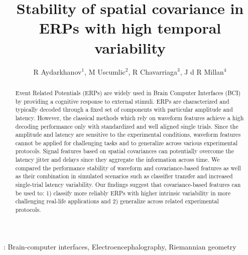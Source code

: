 \documentclass[12pt]{iopart}
\begin{document}
\title[]{Stability of spatial covariance in ERPs with high temporal variability}

\author{R Aydarkhanov$^1$,
M Uscumlic$^2$,
R Chavarriaga$^3$,
J d R Millan$^4$}


\address{$^1$EPFL, Switzerland}
\address{$^2$EPFL, Switzerland}
\address{$^3$EPFL, Switzerland}
\address{$^4$TU Austin, USA}
\vspace{10pt}

\begin{abstract}
Event Related Potentials (ERPs) are widely used in Brain Computer
Interfaces (BCI) by providing a cognitive response to external stimuli.
ERPs are characterized and typically decoded through a fixed set of
components with particular amplitude and latency. 
However, the classical methods which rely on waveform features
achieve a high decoding performance only with standardized
and well aligned single trials. Since the amplitude and latency
are sensitive to the experimental conditions,
waveform features cannot be applied for challenging tasks and
to generalize across various experimental protocols.
Signal features based on spatial covariances can potentially overcome
the latency jitter and delays since they aggregate the information
across time. We compared the performance stability 
of waveform and covariance-based features as well as their combination
in simulated scenarios such as classifier transfer 
and increased single-trial latency variability.
Our findings suggest that covariance-based features
can be used to: 1) classify more reliably ERPs
with higher intrinsic variability in more challenging real-life applications
and 2) generalize across related experimental protocols.
\end{abstract}

%
\vspace{2pc}
: Brain-computer interfaces, Electroencephalography, Riemannian geometry
%
%
% 
%
\end{document}
